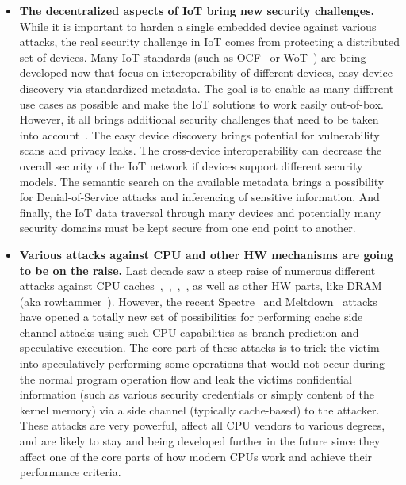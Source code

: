 \begin{itemize}
	\item \textbf{The decentralized aspects of IoT bring new security challenges.} While it is important to harden a single embedded device against various attacks, the real security challenge in IoT comes from protecting a distributed set of devices. Many IoT standards (such as OCF~\cite{ocf} or WoT~\cite{wot}) are being developed now that focus on interoperability of different devices, easy device discovery via standardized metadata. The goal is to enable as many different use cases as possible and make the IoT solutions to work easily out-of-box. However, it all brings additional security challenges that need to be taken into account~\cite{McCool2018}. The easy device discovery brings potential for vulnerability scans and privacy leaks. The cross-device interoperability can decrease the overall security of the IoT network if devices support different security models. The semantic search on the available metadata brings a possibility for Denial-of-Service attacks and inferencing of sensitive information. And finally, the IoT data traversal through many devices and potentially many security domains must be kept secure from one end point to another.
	\item \textbf{Various attacks against CPU and other HW mechanisms are going to be on the raise.} Last decade saw a steep raise of numerous different attacks against CPU caches~\cite{lipp2016armageddon},~\cite{brasser2017software},~\cite{gras2017aslr},~\cite{irazoqui2017cache}, as well as other HW parts, like DRAM (aka rowhammer~\cite{seaborn2015exploiting}). However, the recent Spectre~\cite{Kocher2018spectre} and Meltdown~\cite{Lipp2018meltdown} attacks have opened a totally new set of possibilities for performing cache side channel attacks using such CPU capabilities as branch prediction and speculative execution. The core part of these attacks is to trick the victim into speculatively performing some operations that would not occur during the normal program operation flow and leak the victims confidential information (such as various security credentials or simply content of the kernel memory) via a side channel (typically cache-based) to the attacker. These attacks are very powerful, affect all CPU vendors to various degrees, and are likely to stay and being developed further in the future since they affect one of the core parts of how modern CPUs work and achieve their performance criteria. 		

\end{itemize}
